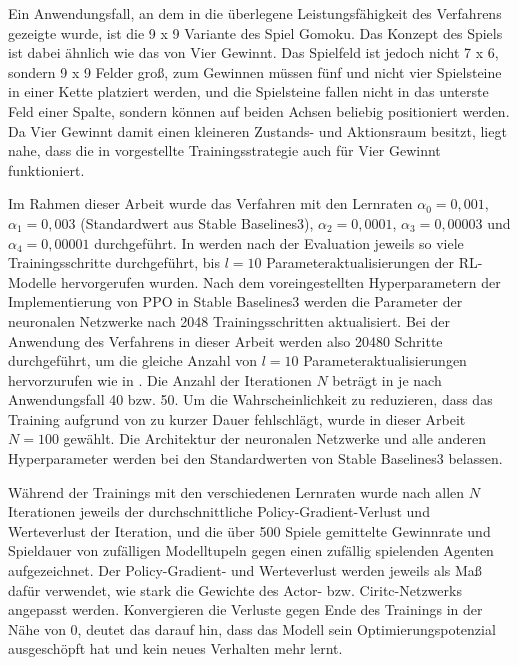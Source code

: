 Ein Anwendungsfall, an dem in \cite{Zhong.2020} die überlegene Leistungsfähigkeit des Verfahrens gezeigte wurde, ist die 9 x 9 Variante des Spiel Gomoku. Das Konzept des Spiels ist dabei ähnlich wie das von Vier Gewinnt. Das Spielfeld ist jedoch nicht 7 x 6, sondern 9 x 9 Felder groß, zum Gewinnen müssen fünf und nicht vier Spielsteine in einer Kette platziert werden, und die Spielsteine fallen nicht in das unterste Feld einer Spalte, sondern können auf beiden Achsen beliebig positioniert werden. Da Vier Gewinnt damit einen kleineren Zustands- und Aktionsraum besitzt, liegt nahe, dass die in \cite{Zhong.2020} vorgestellte Trainingsstrategie auch für Vier Gewinnt funktioniert.


Im Rahmen dieser Arbeit wurde das Verfahren mit den Lernraten $\alpha_0 = 0,001$, $\alpha_1 = 0,003$ (Standardwert aus Stable Baselines3), $\alpha_2 = 0,0001$, $\alpha_3 = 0,00003$ und $\alpha_4 = 0,00001$ durchgeführt. In \cite{Zhong.2020} werden nach der Evaluation jeweils so viele Trainingsschritte durchgeführt, bis $l = 10$ Parameteraktualisierungen der RL-Modelle hervorgerufen wurden. Nach dem voreingestellten Hyperparametern der Implementierung von PPO in Stable Baselines3 werden die Parameter der neuronalen Netzwerke nach 2048 Trainingsschritten aktualisiert. Bei der Anwendung des Verfahrens in dieser Arbeit werden also 20480 Schritte durchgeführt, um die gleiche Anzahl von $l = 10$ Parameteraktualisierungen hervorzurufen wie in \cite{Zhong.2020}. Die Anzahl der Iterationen $N$ beträgt in \cite{Zhong.2020} je nach Anwendungsfall 40 bzw. 50. Um die Wahrscheinlichkeit zu reduzieren, dass das Training aufgrund von zu kurzer Dauer fehlschlägt, wurde in dieser Arbeit $N = 100$ gewählt. Die Architektur der neuronalen Netzwerke und alle anderen Hyperparameter werden bei den Standardwerten von Stable Baselines3 belassen.

Während der Trainings mit den verschiedenen Lernraten wurde nach allen $N$ Iterationen jeweils der durchschnittliche Policy-Gradient-Verlust und Werteverlust der Iteration, und die über 500 Spiele gemittelte Gewinnrate und Spieldauer von zufälligen Modelltupeln gegen einen zufällig spielenden Agenten aufgezeichnet. Der Policy-Gradient- und Werteverlust werden jeweils als Maß dafür verwendet, wie stark die Gewichte des Actor- bzw. Ciritc-Netzwerks angepasst werden. Konvergieren die Verluste gegen Ende des Trainings in der Nähe von 0, deutet das darauf hin, dass das Modell sein Optimierungspotenzial ausgeschöpft hat und kein neues Verhalten mehr lernt.

